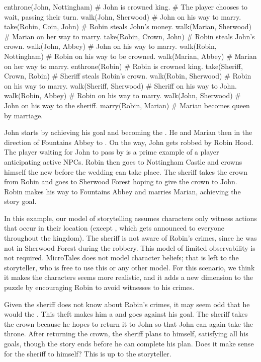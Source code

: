 \documentclass{nilreport}
\begin{document}
\begin{code}
enthrone(John, Nottingham)  # John is crowned king.
# The player chooses to wait, passing their turn.
walk(John, Sherwood)        # John on his way to marry.
take(Robin, Coin, John)     # Robin steals John's money.
walk(Marian, Sherwood)      # Marian on her way to marry.
take(Robin, Crown, John)    # Robin steals John's crown.
walk(John, Abbey)           # John on his way to marry.
walk(Robin, Nottingham)     # Robin on his way to be crowned.
walk(Marian, Abbey)         # Marian on her way to marry.
enthrone(Robin)             # Robin is crowned king.
take(Sheriff, Crown, Robin) # Sheriff steals Robin's crown.
walk(Robin, Sherwood)       # Robin on his way to marry.
walk(Sheriff, Sherwood)     # Sheriff on his way to John.
walk(Robin, Abbey)          # Robin on his way to marry.
walk(John, Sherwood)        # John on his way to the sheriff.
marry(Robin, Marian)        # Marian becomes queen by marriage.
\end{code}

John starts by achieving his  goal and becoming the . He and Marian then  in the direction of Fountains Abbey to . On the way, John gets robbed by Robin Hood. The player waiting for John to pass by is a prime example of a player anticipating active NPCs. Robin then goes to Nottingham Castle and crowns himself the new  before the wedding can take place. The sheriff takes the crown from Robin and goes to Sherwood Forest hoping to give the crown to John. Robin makes his way to Fountains Abbey and marries Marian, achieving the story goal.

In this example, our model of storytelling assumes characters only witness actions that occur in their location (except , which gets announced to everyone throughout the kingdom). The sheriff is not aware of Robin's crimes, since he was not in Sherwood Forest during the robbery. This model of limited observability is not required. MicroTales does not model character beliefs; that is left to the storyteller, who is free to use this or any other model. For this scenario, we think it makes the characters seems more realistic, and it adds a new dimension to the puzzle by encouraging Robin to avoid witnesses to his crimes.

Given the sheriff does not know about Robin's crimes, it may seem odd that he would  the . This theft makes him a  and goes against his  goal. The sheriff takes the crown because he hopes to return it to John so that John can again take the throne. After returning the crown, the sheriff plans to  himself, satisfying all his goals, though the story ends before he can complete his plan. Does it make sense for the sheriff to  himself? This is up to the storyteller.
\end{document}
